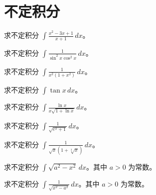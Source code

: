 \renewcommand{\thesection}{\arabic{section}}\renewcommand{\theHsection}{chapter.\arabic{section}}\setcounter{section}{3}\section{不定积分}
\noindent\begin{minipage}{\textwidth}
求不定积分 $\displaystyle\int \frac{x^2-3x+1}{x+1}\,dx$。
\end{minipage}\par\vfill
\noindent\begin{minipage}{\textwidth}
求不定积分 $\displaystyle\int \frac1{\sin^2x\cos^2x}\,dx$。
\end{minipage}\par\vfill
\noindent\begin{minipage}{\textwidth}
求不定积分 $\displaystyle\int \frac1{x^2(1+x^2)}\,dx$。
\end{minipage}\par\vfill
\noindent\begin{minipage}{\textwidth}
求不定积分 $\displaystyle\int \tan x\,dx$。
\end{minipage}\par\vfill
\newpage
\noindent\begin{minipage}{\textwidth}
求不定积分 $\displaystyle\int \frac{\ln x}{x\sqrt{1+\ln x}}\,dx$。
\end{minipage}\par\vfill
\noindent\begin{minipage}{\textwidth}
求不定积分 $\displaystyle\int \frac1{\sqrt{e^x+1}}\,dx$。
\end{minipage}\par\vfill
\noindent\begin{minipage}{\textwidth}
求不定积分 $\displaystyle\int \frac1{\sqrt{x}(1+\sqrt[3]{x})}\,dx$。
\end{minipage}\par\vfill
\noindent\begin{minipage}{\textwidth}
求不定积分 $\displaystyle\int \sqrt{a^2-x^2}\,dx$。其中 $a>0$ 为常数。
\end{minipage}\par\vfill
\newpage
\noindent\begin{minipage}{\textwidth}
求不定积分 $\displaystyle\int \frac1{\sqrt{x^2-a^2}}\,dx$。其中 $a>0$ 为常数。
\end{minipage}\par\vfill

